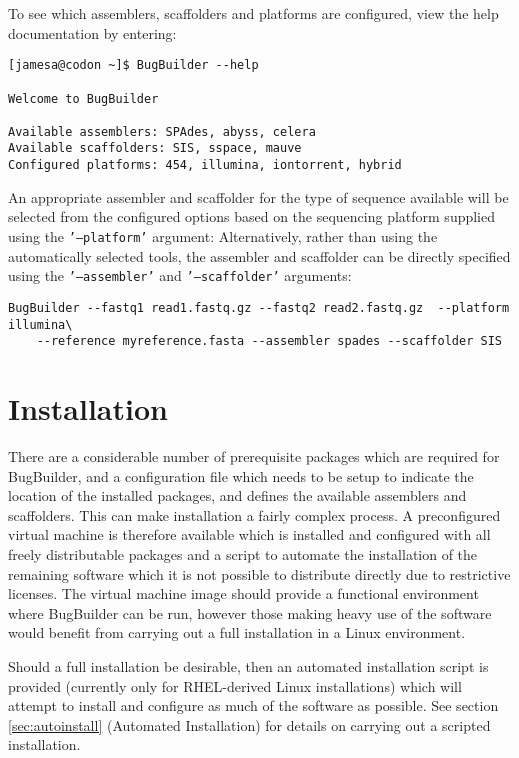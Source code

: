 \documentclass[a4paper,10pt]{article}
\begin{document}
To see which assemblers, scaffolders and platforms are configured, view
the help documentation by entering:

\begin{verbatim}
[jamesa@codon ~]$ BugBuilder --help

Welcome to BugBuilder

Available assemblers: SPAdes, abyss, celera
Available scaffolders: SIS, sspace, mauve
Configured platforms: 454, illumina, iontorrent, hybrid
\end{verbatim}


An appropriate assembler and scaffolder for the type of sequence available will
be selected from the configured options based on the sequencing platform
supplied using the {\tt '--platform'} argument: Alternatively, rather than
using the automatically selected tools, the assembler and scaffolder can be
directly specified using the {\tt '--assembler'} and {\tt '--scaffolder'}
arguments:

\begin{verbatim}
BugBuilder --fastq1 read1.fastq.gz --fastq2 read2.fastq.gz  --platform illumina\
    --reference myreference.fasta --assembler spades --scaffolder SIS
\end{verbatim}


\section{Installation}

There are a considerable number of prerequisite packages which are required for
BugBuilder, and a configuration file which needs to be setup to indicate the
location of the installed packages, and defines the available assemblers and
scaffolders. This can make installation a fairly complex process. A
preconfigured virtual machine is therefore available which is installed and
configured with all freely distributable packages and a script to automate the
installation of the remaining software which it is not possible to distribute
directly due to restrictive licenses. The virtual machine image should provide
a functional environment where BugBuilder can be run, however those making
heavy use of the software would benefit from carrying out a full installation
in a Linux environment.

Should a full installation be desirable, then an automated  installation script
is provided (currently only for RHEL-derived Linux installations) which will
attempt to install and configure as much of the software as possible. See
section \ref{sec:autoinstall} (Automated Installation) for details on carrying
out a scripted installation. 
\end{document}
